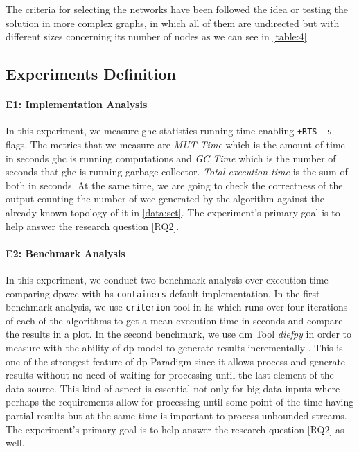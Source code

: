    The criteria for selecting the networks have been followed the idea or testing the solution in more complex graphs, in which all of them are undirected but with different sizes concerning its number of nodes as we can see in  \autoref{table:4}. 
  
  \subsection{Experiments Definition}\label{sub:exp:def}
  \paragraph{E1: Implementation Analysis}
  In this experiment, we measure \acrshort{ghc} statistics running time enabling \texttt{+RTS -s} flags. The metrics that we measure are \emph{MUT Time} which is the amount of time in seconds \acrshort{ghc} is running computations and \emph{GC Time} which is the number of seconds that \acrshort{ghc} is running garbage collector. \emph{Total execution time} is the sum of both in seconds. At the same time, we are going to check the correctness of the output counting the number of \acrshort{wcc} generated by the algorithm against the already known topology of it in \autoref{data:set}. The experiment's primary goal is to help answer the research question [RQ2].
  
  \paragraph{E2: Benchmark Analysis}
  In this experiment, we conduct two benchmark analysis over execution time comparing \acrshort{dpwcc} with \acrshort{hs} \texttt{containers} default implementation. In the first benchmark analysis, we use \texttt{criterion} \cite{criterion} tool in \acrshort{hs} which runs over four iterations of each of the algorithms to get a mean execution time in seconds and compare the results in a plot. In the second benchmark, we use \acrfull{dm} Tool \emph{diefpy} \cite{diefpy} in order to measure with the ability of \acrshort{dp} model to generate results incrementally \cite{diefpaper}. This is one of the strongest feature of \acrshort{dp} Paradigm since it allows process and generate results without no need of waiting for processing until the last element of the data source. This kind of aspect is essential not only for big data inputs where perhaps the requirements allow for processing until some point of the time having partial results but at the same time is important to process unbounded streams. The experiment's primary goal is to help answer the research question [RQ2] as well.
  
